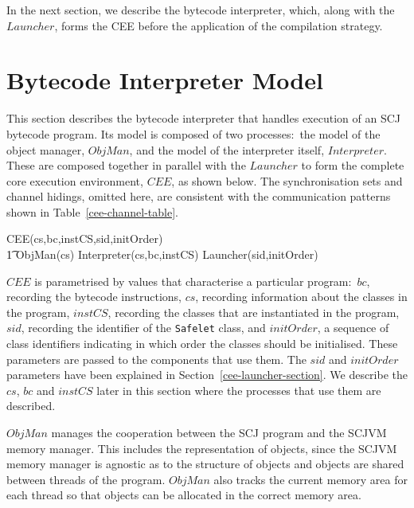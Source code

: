 

In the next section, we describe the bytecode interpreter, which,
along with the $Launcher$, forms the CEE before the application of the
compilation strategy.

% 

\section{Bytecode Interpreter Model}
\label{cee-interpreter-section}

This section describes the bytecode interpreter that handles execution
of an SCJ bytecode program.
Its model is composed of two processes:~the model of the object
manager, $ObjMan$, and the model of the interpreter itself,
$Interpreter$.
These are composed together in parallel with the $Launcher$ to form
the complete core execution environment, $CEE$, as shown below.
The synchronisation sets and channel hidings, omitted here, are
consistent with the communication patterns shown in
Table~\ref{cee-channel-table}.
\begin{circus}
  CEE(cs,bc,instCS,sid,initOrder) \circdef \\
  \t1 ObjMan(cs) \parallel Interpreter(cs,bc,instCS) \parallel Launcher(sid,initOrder)
\end{circus}
$CEE$ is parametrised by values that characterise a particular
program:~$bc$, recording the bytecode instructions, $cs$, recording
information about the classes in the program, $instCS$, recording the
classes that are instantiated in the program, $sid$, recording the
identifier of the \texttt{Safelet} class, and $initOrder$, a sequence
of class identifiers indicating in which order the classes should be
initialised.
These parameters are passed to the components that use them.
The $sid$ and $initOrder$ parameters have been explained in
Section~\ref{cee-launcher-section}. 
We describe the $cs$, $bc$ and $instCS$ later in this section where
the processes that use them are described.

$ObjMan$ manages the cooperation between the SCJ program and the SCJVM
memory manager.
This includes the representation of objects, since the SCJVM memory
manager is agnostic as to the structure of objects and objects are
shared between threads of the program.
$ObjMan$ also tracks the current memory area for each thread so that
objects can be allocated in the correct memory area.

